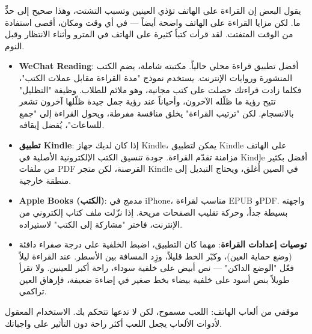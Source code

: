 
يقول البعض إن القراءة على الهاتف تؤذي العينين وتسبب التشتت، وهذا صحيح إلى حدٍّ ما. لكن مزايا القراءة على الهاتف واضحة أيضاً — في أي وقت ومكان، أقصى استفادة من الوقت المتفتت. لقد قرأت كتباً كثيرة على الهاتف في المترو وأثناء الانتظار وقبل النوم.

\begin{itemize}
  \item \textbf{WeChat Reading}: أفضل تطبيق قراءة محلي حالياً. مكتبته شاملة، يضم الكتب المنشورة وروايات الإنترنت. يستخدم نموذج "مدة القراءة مقابل عملات الكتب"، فكلما زادت قراءتك حصلت على كتب مجانية، وهو ملائم للطلاب. وظيفة "التظليل" تتيح رؤية ما ظلّله الآخرون، وأحياناً عند رؤية جمل جيدة ظلّلها آخرون تشعر بالانسجام. لكن "ترتيب القراءة" يخلق منافسة مفرطة، ويحول القراءة إلى "جمع للساعات"، يُفضل إيقافه.
  \item \textbf{تطبيق Kindle}: إذا كان لديك جهاز Kindle، يمكن لتطبيق Kindle على الهاتف مزامنة تقدّم القراءة. جودة تنسيق الكتب الإلكترونية الأصلية في Kindle أفضل بكثير من ملفات PDF القرصنة، لكن متجر Kindle في الصين أُغلق، ويحتاج التبديل إلى منطقة خارجية.
  \item \textbf{Apple Books (الكتب)}: مدمج في iPhone، مناسب لقراءة EPUB وPDF. واجهته بسيطة جداً، وحركة تقليب الصفحات مريحة. إذا نزّلت ملف كتاب إلكتروني من الإنترنت، فاختر "مشاركة إلى الكتب" لاستيراده.
  \item \textbf{توصيات إعدادات القراءة}: مهما كان التطبيق، اضبط الخلفية على درجة صفراء دافئة (وضع حماية العين)، وكبّر الخط قليلاً، وزِد المسافة بين الأسطر. عند القراءة ليلاً فعّل "الوضع الداكن" — نص أبيض على خلفية سوداء، راحة أكبر للعينين. ولا تقرأ طويلاً بنص أسود على خلفية بيضاء بخط صغير في إضاءة ضعيفة، فإرهاق العين تراكمي.
\end{itemize}


موقفي من ألعاب الهاتف: اللعب مسموح، لكن لا تدعها تتحكم بك. الاستخدام المعقول لأدوات الألعاب يجعل اللعب أكثر راحة دون التأثير على واجباتك.

